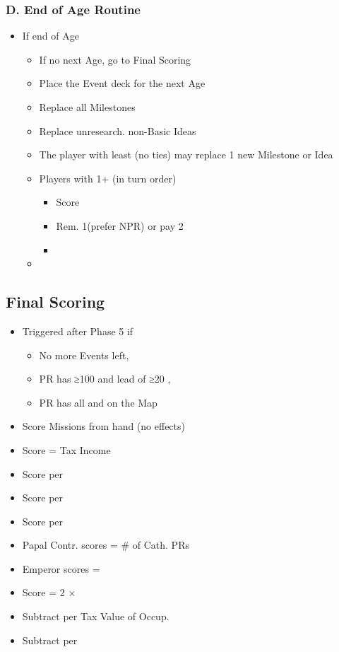 \documentclass[10pt]{article}
\begin{document}
\subsubsection*{D. End of Age Routine}
\begin{itemize}
	\item If end of Age
	\begin{itemize}
		\item If no next Age, go to Final Scoring
		\item Place the Event deck for the next Age
		\item Replace all Milestones
		\item Replace unresearch. non-Basic Ideas
		\item The player with least \prestige (no ties) may replace 1 new Milestone or Idea
		\item Players with 1+ \marriage (in turn order)
		\begin{itemize}
			\item Score 
			\item Rem. 1\marriage (prefer NPR) or pay 2\diplopower
			\item {}
		\end{itemize}
		\item {}
	\end{itemize}
\end{itemize}

\subsection*{Final Scoring}
\begin{itemize}
	\item Triggered after Phase 5 if
	\begin{itemize}
		\item No more Events left, 
		\item PR has ≥100 \prestige and lead of ≥20 \prestige, 
		\item PR has all \towns and \vassals on the Map
	\end{itemize}
	\item Score Missions from hand (no effects)
	\item Score \prestige = Tax Income
	\item Score  per \core 
	\item Score  per \marriage
	\item Score  per \alliance
	\item Papal Contr. scores \prestige = \# of Cath. PRs
	\item Emperor scores \prestige = \authority
	\item Score \prestige = 2 × \stability
	\item Subtract  per Tax Value of Occup. \towns
	\item Subtract  per \interest
\end{itemize}
\end{document}

